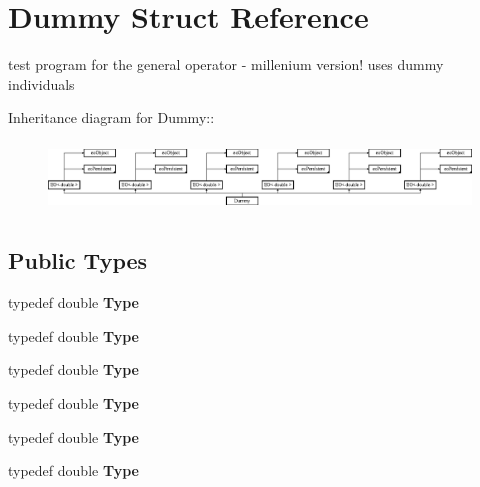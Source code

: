 \section{Dummy Struct Reference}
\label{struct_dummy}
test program for the general operator - millenium version! uses dummy individuals  


Inheritance diagram for Dummy::\begin{figure}[H]
\begin{center}
\leavevmode
\includegraphics[height=1.86667cm]{struct_dummy}
\end{center}
\end{figure}
\subsection*{Public Types}
\begin{CompactItemize}
\item 
typedef double {\bf Type}\label{struct_dummy_w0}

\item 
typedef double {\bf Type}\label{struct_dummy_w1}

\item 
typedef double {\bf Type}\label{struct_dummy_w2}

\item 
typedef double {\bf Type}\label{struct_dummy_w3}

\item 
typedef double {\bf Type}\label{struct_dummy_w4}

\item 
typedef double {\bf Type}\label{struct_dummy_w5}

\end{CompactItemize}
